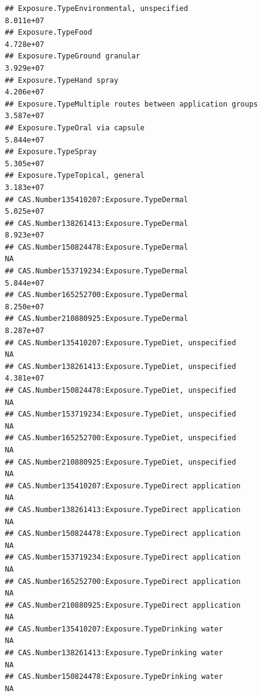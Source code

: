 \documentclass[
  12pt,
]{article}
\begin{document}
\begin{verbatim}
## Exposure.TypeEnvironmental, unspecified                                      8.011e+07
## Exposure.TypeFood                                                            4.728e+07
## Exposure.TypeGround granular                                                 3.929e+07
## Exposure.TypeHand spray                                                      4.206e+07
## Exposure.TypeMultiple routes between application groups                      3.587e+07
## Exposure.TypeOral via capsule                                                5.844e+07
## Exposure.TypeSpray                                                           5.305e+07
## Exposure.TypeTopical, general                                                3.183e+07
## CAS.Number135410207:Exposure.TypeDermal                                      5.025e+07
## CAS.Number138261413:Exposure.TypeDermal                                      8.923e+07
## CAS.Number150824478:Exposure.TypeDermal                                             NA
## CAS.Number153719234:Exposure.TypeDermal                                      5.844e+07
## CAS.Number165252700:Exposure.TypeDermal                                      8.250e+07
## CAS.Number210880925:Exposure.TypeDermal                                      8.287e+07
## CAS.Number135410207:Exposure.TypeDiet, unspecified                                  NA
## CAS.Number138261413:Exposure.TypeDiet, unspecified                           4.381e+07
## CAS.Number150824478:Exposure.TypeDiet, unspecified                                  NA
## CAS.Number153719234:Exposure.TypeDiet, unspecified                                  NA
## CAS.Number165252700:Exposure.TypeDiet, unspecified                                  NA
## CAS.Number210880925:Exposure.TypeDiet, unspecified                                  NA
## CAS.Number135410207:Exposure.TypeDirect application                                 NA
## CAS.Number138261413:Exposure.TypeDirect application                                 NA
## CAS.Number150824478:Exposure.TypeDirect application                                 NA
## CAS.Number153719234:Exposure.TypeDirect application                                 NA
## CAS.Number165252700:Exposure.TypeDirect application                                 NA
## CAS.Number210880925:Exposure.TypeDirect application                                 NA
## CAS.Number135410207:Exposure.TypeDrinking water                                     NA
## CAS.Number138261413:Exposure.TypeDrinking water                                     NA
## CAS.Number150824478:Exposure.TypeDrinking water                                     NA

\end{verbatim}
\end{document}
